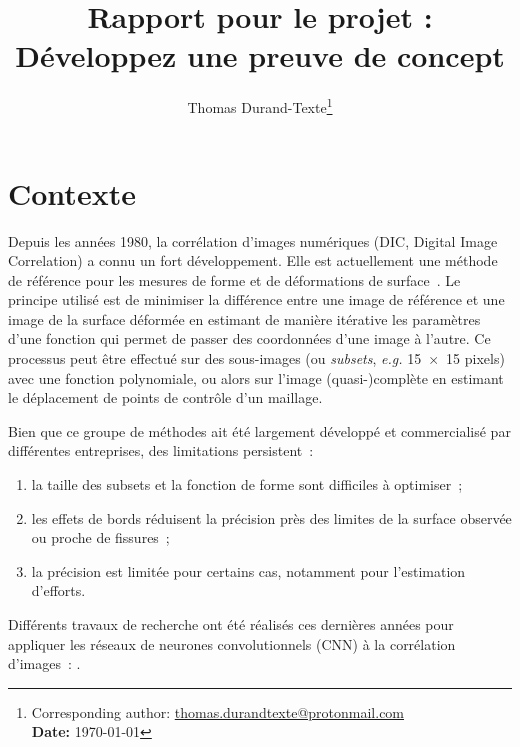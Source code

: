 \documentclass[
	a4paper, %
	10pt, %
	twoside, %
	french
]{LTJournalArticle}
\title{Rapport pour le projet : Développez une preuve de concept} %
\author{%
	Thomas Durand-Texte\thanks{Corresponding author: \href{mailto:thomas.durandtexte@protonmail.com}{thomas.durandtexte@protonmail.com}\\ \textbf{Date:} \today}
}
\begin{document}
\maketitle %


\tableofcontents

\section{Contexte}

Depuis les années 1980, la corrélation d'images numériques (DIC, Digital Image Correlation) a connu un fort développement.
Elle est actuellement une méthode de référence pour les mesures de forme et de déformations de surface~\cite{Schreir:2010}.
Le principe utilisé est de minimiser la différence entre une image de référence et une image de la surface déformée en estimant de manière itérative les paramètres d'une fonction qui permet de passer des coordonnées d'une image à l'autre.
Ce processus peut être effectué sur des sous-images (ou \textit{subsets}, \textit{e.g.} 15~$\times$~15 pixels) avec une fonction polynomiale, ou alors sur l'image (quasi-)complète en estimant le déplacement de points de contrôle d'un maillage.

Bien que ce groupe de méthodes ait été largement développé et commercialisé par différentes entreprises, des limitations persistent~:
\begin{enumerate}
	\item la taille des subsets et la fonction de forme sont difficiles à optimiser~;
	\item les effets de bords réduisent la précision près des limites de la surface observée ou proche de fissures~;
	\item la précision est limitée pour certains cas, notamment pour l'estimation d'efforts.
\end{enumerate}


Différents travaux de recherche ont été réalisés ces dernières années pour appliquer les réseaux de neurones convolutionnels (CNN) à la corrélation d'images~: \cite{Min:2019,Boukhtache:2021,Yang:DeepDic2022,WANG:2023107278, DUAN:2023107234, BOUKHTACHE:2023107367, JIANG:2023103840}.
\end{document}
